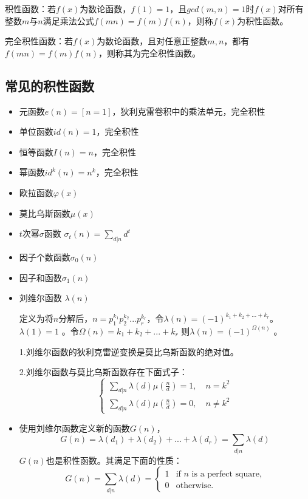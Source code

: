 {\heiti 积性函数：}若$f(x)$为数论函数，$f(1)=1$，且$gcd(m,n)=1$时$f(x)$对所有整数$m$与$n$满足乘法公式$f(mn)=f(m)f(n)$，则称$f(x)$为积性函数。

{\heiti 完全积性函数：}若$f(x)$为数论函数，且对任意正整数$m,n$，都有$f(mn)=f(m)f(n)$，则称其为完全积性函数。



\subsection{常见的积性函数}
\begin{itemize}
\item 元函数\quad $e(n)=[n=1]$，狄利克雷卷积中的乘法单元，完全积性
\item 单位函数\quad $id(n)=1$，完全积性
\item 恒等函数\quad $I(n)=n$，完全积性
\item 幂函数\quad $id^k(n)=n^k$，完全积性
\item 欧拉函数$\varphi(x)$
\item 莫比乌斯函数$\mu(x)$
\item $t$次幂$\sigma$函数 $\sigma_t(n)=\sum_{d|n}d^t$
\item 因子个数函数$\sigma_0(n)$
\item 因子和函数$\sigma_1(n)$
\item 刘维尔函数 $\lambda(n)$

\qquad 定义为将$n$分解后，$n=p_1^{k_1}p_2^{k_2}...p_r^{k_r}$，令$\lambda(n)=(-1)^{k_1+k_2+...+k_r}$。$\lambda(1)=1$  。令$\Omega(n)= k_1+k_2+...+k_r$     则$\lambda(n)=(-1)^{\Omega(n)}$ 。
\begin{note}
1.刘维尔函数的狄利克雷逆变换是莫比乌斯函数的绝对值。

2.刘维尔函数与莫比乌斯函数存在下面式子：
$$
\left\{\begin{matrix}
\sum_{d|n}\lambda(d)\mu(\frac{n}{d}) =1  ,\quad n=k^2 \\ 
\sum_{d|n}\lambda(d)\mu(\frac{n}{d}) =0,\quad  n\neq k^2 
\end{matrix}\right.
$$
\end{note}

\item 使用刘维尔函数定义新的函数$G(n)$，
$$
G(n)=\lambda(d_1)+\lambda(d_2)+...+\lambda(d_r)=\sum_{d|n}\lambda(d)
$$
$G(n)$也是积性函数。其满足下面的性质：
$$
G(n)=\sum _{{d|n}}\lambda (d)={\begin{cases}1&{\text{if }}n{\text{ is a perfect square,}}\\0&{\text{otherwise.}}\end{cases}}
$$
\end{itemize}


